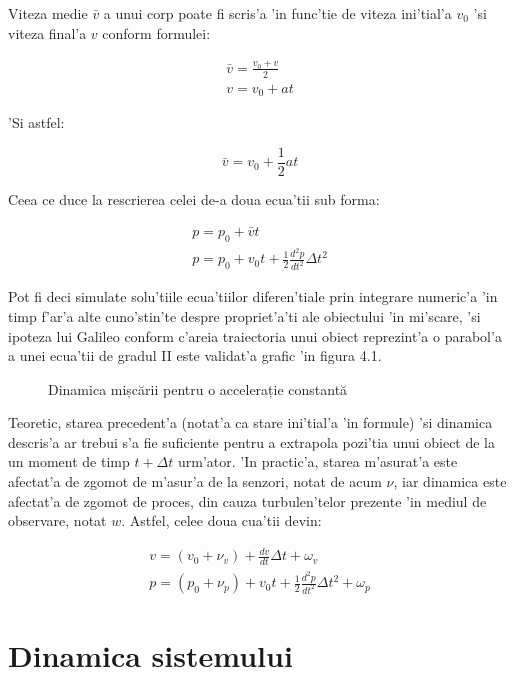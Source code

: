 \documentclass[12pt,a4paper,twoside]{report}
\begin{document}
Viteza medie $\bar v$ a unui corp poate fi scris'a 'in func'tie de viteza ini'tial'a $v_0$ 'si viteza final'a $v$ conform formulei:

\begin{gather}
 \bar v = \frac{v_0 + v}{2} \\
 v = v_0 + at
\end{gather}

'Si astfel:

\begin{equation}
    \bar v = v_0 + \frac{1}{2}at
\end{equation}

Ceea ce duce la rescrierea celei de-a doua ecua'tii sub forma:

\begin{gather}
  p = p_0 + \bar v t \\
  p = p_0 + v_0t + \frac{1}{2}\frac{d^2p}{dt^2} \Delta t^2
\end{gather}

Pot fi deci simulate solu'tiile ecua'tiilor diferen'tiale prin integrare numeric'a 'in timp f'ar'a alte cuno'stin'te despre propriet'a'ti ale obiectului 'in mi'scare, 'si ipoteza lui Galileo conform c'areia traiectoria unui obiect reprezint'a o parabol'a a unei ecua'tii de gradul II este validat'a grafic 'in figura 4.1.


\begin{figure}[h]
  \centering
  
  \caption{Dinamica mișcării pentru o accelerație constantă}
\end{figure}

Teoretic, starea precedent'a (notat'a ca stare ini'tial'a 'in formule) 'si dinamica descris'a ar trebui s'a fie suficiente pentru a extrapola pozi'tia unui obiect de la un moment de timp $t + \Delta t$ urm'ator. 'In practic'a, starea m'asurat'a este afectat'a de zgomot de m'asur'a de la senzori, notat de acum $\nu$, iar dinamica este afectat'a de zgomot de proces, din cauza turbulen'telor prezente 'in mediul de observare, notat $w$. Astfel, celee doua cua'tii devin:

\begin{gather}
  v = (v_0 + \nu_v) + \frac{dv}{dt} \Delta t + \omega_v  \\
  p = (p_0 + \nu_p) + v_0t + \frac{1}{2}\frac{d^2p}{dt^2} \Delta t^2 + \omega_p
\end{gather}

\section{Dinamica sistemului}
\end{document}
